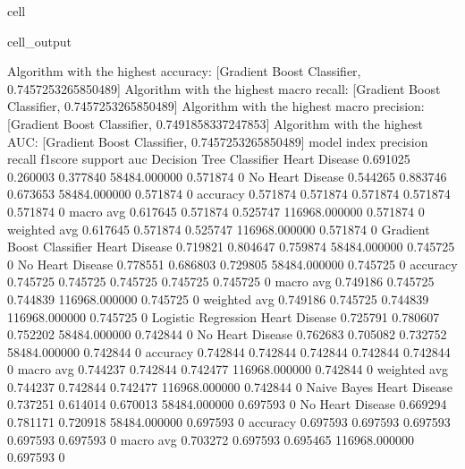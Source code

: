 \documentclass[letterpaper,10pt,english]{jupyterBook}
\begin{document}
\begin{sphinxuseclass}{cell}
\begin{sphinxVerbatimOutput}
\begin{sphinxuseclass}{cell_output}
\begin{sphinxVerbatim}[commandchars=\\\{\}]
Algorithm with the highest accuracy: [\PYGZsq{}Gradient Boost Classifier\PYGZsq{}, 0.7457253265850489]
Algorithm with the highest macro recall:
        [\PYGZsq{}Gradient Boost Classifier\PYGZsq{}, 0.7457253265850489]
Algorithm with the highest macro precision:
        [\PYGZsq{}Gradient Boost Classifier\PYGZsq{}, 0.7491858337247853]
Algorithm with the highest AUC:
        [\PYGZsq{}Gradient Boost Classifier\PYGZsq{}, 0.7457253265850489]
model                      index             precision  recall    f1\PYGZhy{}score  support        auc     
Decision Tree Classifier   Heart Disease     0.691025   0.260003  0.377840  58484.000000   0.571874    0
                           No Heart Disease  0.544265   0.883746  0.673653  58484.000000   0.571874    0
                           accuracy          0.571874   0.571874  0.571874  0.571874       0.571874    0
                           macro avg         0.617645   0.571874  0.525747  116968.000000  0.571874    0
                           weighted avg      0.617645   0.571874  0.525747  116968.000000  0.571874    0
Gradient Boost Classifier  Heart Disease     0.719821   0.804647  0.759874  58484.000000   0.745725    0
                           No Heart Disease  0.778551   0.686803  0.729805  58484.000000   0.745725    0
                           accuracy          0.745725   0.745725  0.745725  0.745725       0.745725    0
                           macro avg         0.749186   0.745725  0.744839  116968.000000  0.745725    0
                           weighted avg      0.749186   0.745725  0.744839  116968.000000  0.745725    0
Logistic Regression        Heart Disease     0.725791   0.780607  0.752202  58484.000000   0.742844    0
                           No Heart Disease  0.762683   0.705082  0.732752  58484.000000   0.742844    0
                           accuracy          0.742844   0.742844  0.742844  0.742844       0.742844    0
                           macro avg         0.744237   0.742844  0.742477  116968.000000  0.742844    0
                           weighted avg      0.744237   0.742844  0.742477  116968.000000  0.742844    0
Naive Bayes                Heart Disease     0.737251   0.614014  0.670013  58484.000000   0.697593    0
                           No Heart Disease  0.669294   0.781171  0.720918  58484.000000   0.697593    0
                           accuracy          0.697593   0.697593  0.697593  0.697593       0.697593    0
                           macro avg         0.703272   0.697593  0.695465  116968.000000  0.697593    0

\end{sphinxVerbatim}
\end{sphinxuseclass}
\end{sphinxVerbatimOutput}
\end{sphinxuseclass}
\end{document}
